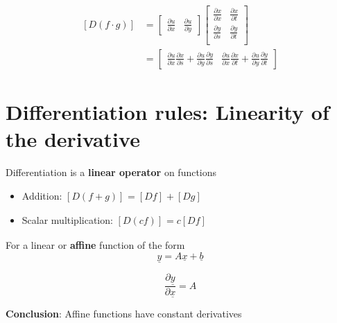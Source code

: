    \begin{align*}
      \left[ D (f \cdot g) \right]_{} &= \begin{bmatrix} 
            \frac{\partial u}{\partial x} & \frac{\partial u}{\partial y}
         \end{bmatrix}\begin{bmatrix} 
            \frac{\partial x}{\partial x} & \frac{\partial x}{\partial t} \\  
            \frac{\partial y}{\partial s} & \frac{\partial y}{\partial t} \\  
         \end{bmatrix} \\
                                      &= \begin{bmatrix} 
                                        \frac{\partial u}{\partial x} \frac{\partial x}{\partial s} + 
                                        \frac{\partial u}{\partial y} \frac{\partial y}{\partial s} &
                                        \frac{\partial u}{\partial x} \frac{\partial x}{\partial t} + 
                                        \frac{\partial u}{\partial y} \frac{\partial y}{\partial t}
                                      \end{bmatrix}
   \end{align*}

   \section{Differentiation rules: Linearity of the derivative}
   \begin{framed}
      Differentiation is a \textbf{linear operator} on functions
      \begin{itemize}
         \item Addition: $\left[ D (f+g) \right]_{} = \left[ D f \right]_{}  + \left[ D g \right]_{} $
         \item Scalar multiplication: $\left[ D (cf) \right]_{}  = c \left[ D f \right]_{} $
      \end{itemize}
   \end{framed}

   For a linear or \textbf{affine} function of the form \[
     \underline{y} = A \underline{x} + \underline{b}
   \] 

   \[
     \frac{\partial \underline{y}}{\partial \underline{x}} = A
   \] 

   \textbf{Conclusion}: Affine functions have constant derivatives \\

